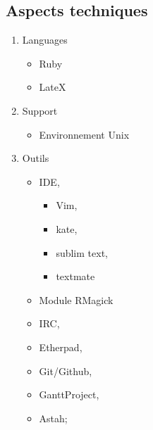\documentclass[12pt]{beamer}
\begin{document}
\subsection{Aspects techniques}
    \begin{frame}
    
        \begin{enumerate}
            \item Languages
            \begin{itemize}
                \item Ruby
                \item LateX
            \end{itemize}
                
            \item Support
            \begin{itemize}
                \item Environnement Unix
            \end{itemize}
                
            \item Outils
            \begin{itemize}
                \item IDE,
                \begin{itemize}
                    \item Vim,
                    \item kate,
                    \item sublim text,
                    \item textmate
                \end{itemize}
                \item Module RMagick
                \item IRC,
                \item Etherpad,
                \item Git/Github,
                \item GanttProject,
                \item Astah;
                    
            \end{itemize}
                
                    
        \end{enumerate}
\end{frame}
\end{document}
